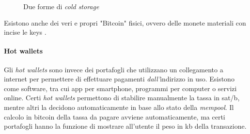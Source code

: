 \documentclass {article}
\begin{document}
\begin{figure}[htb!]

 
\caption{Due forme di \textit{cold storage}}

\end{figure}
\vspace {0.2cm}
\noindent
%
Esistono anche dei veri e propri "Bitcoin" fisici, ovvero delle monete materiali con incise le keys \cite{cold}.

\paragraph {Hot wallets}

Gli \textit{hot wallets} sono invece dei portafogli che utilizzano un collegamento a internet per permettere di effettuare pagamenti \emph{dall'}indirizzo in uso.
Esistono come software, tra cui app per smartphone, programmi per computer o servizi online.
Certi \textit{hot wallets} permettono di stabilire manualmente la tassa in sat/b, mentre altri la decidono automaticamente in base allo stato della \textit{mempool}.
Il calcolo in bitcoin della tassa da pagare avviene automaticamente, ma certi portafogli hanno la funzione di mostrare all'utente il peso in kb della transazione.
\end{document}
